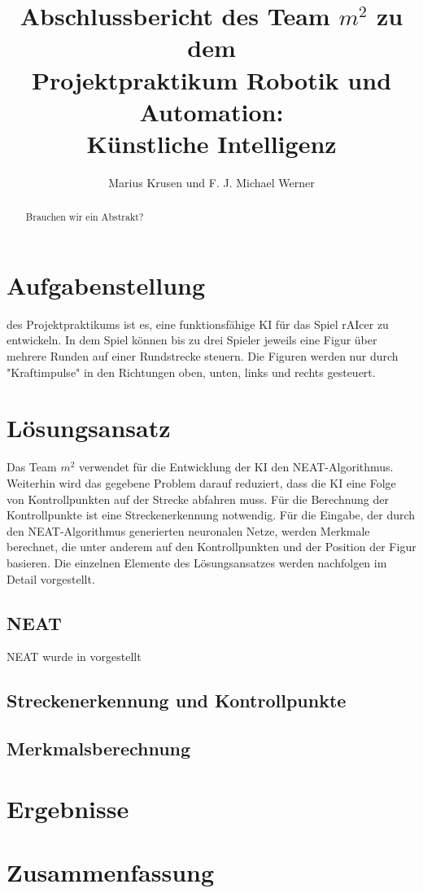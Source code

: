 \documentclass[11pt,final,journal,a4paper,towside,towcolumn]{IEEEtran}
\begin{document}
\begin{acronym}
\end{acronym}
	
\title{Abschlussbericht des Team $m^2$ zu dem \\Projektpraktikum Robotik und Automation:\\Künstliche Intelligenz}
\author{Marius Krusen und F. J. Michael Werner}
\maketitle

\begin{abstract}
Brauchen wir ein Abstrakt?
\end{abstract}

\section{Aufgabenstellung}
 des Projektpraktikums ist es, eine funktionsfähige  \ac{KI} für das Spiel rAIcer zu entwickeln. In dem Spiel können bis zu drei Spieler jeweils eine Figur über mehrere Runden auf einer Rundstrecke steuern. Die Figuren werden nur durch "Kraftimpulse" in den Richtungen oben, unten, links und rechts gesteuert.

\section{Lösungsansatz}
Das Team $m^2$ verwendet für die Entwicklung der \ac{KI} den \ac{NEAT}-Algorithmus. Weiterhin wird das gegebene Problem darauf reduziert, dass die \ac{KI} eine Folge von Kontrollpunkten auf der Strecke abfahren muss. Für die Berechnung der Kontrollpunkte ist eine Streckenerkennung notwendig. Für die Eingabe, der durch den \ac{NEAT}-Algorithmus generierten neuronalen Netze, werden Merkmale berechnet, die unter anderem auf den Kontrollpunkten und der Position der Figur basieren. Die einzelnen Elemente des Lösungsansatzes werden nachfolgen im Detail vorgestellt.
\subsection{NEAT}
NEAT wurde in \cite{stanley:gecco02-efficient} vorgestellt
\subsection{Streckenerkennung und Kontrollpunkte}

\subsection{Merkmalsberechnung}

\section{Ergebnisse}

\section{Zusammenfassung}

{}

\end{document}

